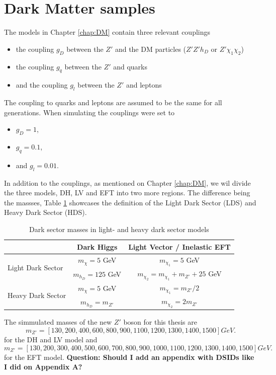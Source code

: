 \documentclass[12pt, a4paper]{book}
\begin{document}
\section{Dark Matter samples}\label{chap:DM_sample}
The models in Chapter \ref{chap:DM} contain three relevant couplings
\begin{itemize}
    \item the coupling $g_D$ between the $Z'$ and the DM particles ($Z'Z'h_D$ or $Z'\chi_1\chi_2$)
    \item the coupling $g_q$ between the $Z'$ and quarks
    \item and the coupling $g_l$ between the $Z'$ and leptons
\end{itemize}
The coupling to quarks and leptons are assumed to be the same for all generations. When simulating the couplings were set to
\begin{itemize}
    \item $g_D = 1$,
    \item $g_q=0.1$,
    \item and $g_l=0.01$.
\end{itemize}
In addition to the couplings, as mentioned on Chapter \ref{chap:DM}, we wil divide the three models, DH, LV and EFT into two more regions. The difference being the massses, Table \ref{tab:DMass} showcases the definition of the Light Dark Sector (LDS) and Heavy Dark Sector (HDS).
\begin{table}[!h]
    \centering\caption{Dark sector masses in light- and heavy dark sector models}
    \begin{tabular}{l|c|c}\midrule\midrule
                                                                            & Dark Higgs            & Light Vector / Inelastic EFT              \\\midrule
        \multirow{2}{*}[-2\baselineskip]{Light Dark Sector}                 & $m_\chi = 5$ GeV      & $m_{\chi_1}= 5$ GeV                       \\
                                                                            & $m_{h_D} = 125$ GeV   & $m_{\chi_2}= m_{\chi_1}+m_{Z'} + 25$ GeV  \\\midrule
        \multirow{2}{*}[-2\baselineskip]{Heavy Dark Sector}                 & $m_\chi = 5$ GeV      & $m_{\chi_1}= m_{Z'}/2$                    \\
                                                                            & $m_{h_D} = m_{Z'}$    & $m_{\chi_2}= 2m_{Z'}$                     \\\midrule\midrule
    \end{tabular}
    \label{tab:DMass}
\end{table}
\newpage\noindent The simmulated masses of the new $Z'$ boson for this thesis are
$$
m_{Z'} = [130, 200, 400, 600, 800, 900, 1100, 1200, 1300, 1400, 1500] GeV.
$$
for the DH and LV model and 
$$
m_{Z'} = [130, 200, 300, 400, 500, 600, 700, 800, 900, 1000, 1100, 1200, 1300, 1400, 1500] GeV.
$$
for the EFT model. \textbf{Question: Should I add an appendix with DSIDs like I did on Appendix A?}
\end{document}

